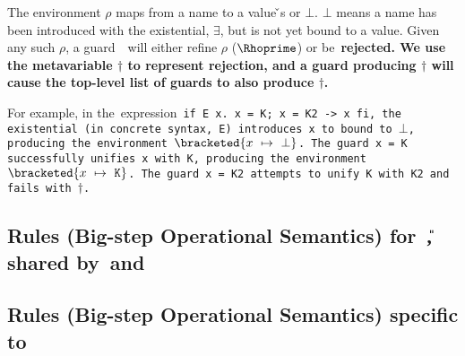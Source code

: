 \documentclass[manuscript,screen 12pt, nonacm]{acmart}
\begin{document}


The environment $\rho$ maps from a name to a value {\v}s or $\bot$. $\bot$ means
a name has been introduced with the existential, $\exists$, but is not yet bound
to a value. Given any such $\rho$, a guard~\g\ will either refine $\rho$
($\Rhoprime$) or be~\bf{rejected}. We use the metavariable $\dagger$ to
represent rejection, and a guard producing $\dagger$ will cause the top-level
list of guards to also produce $\dagger$. 

    \gfail

  For example, in the~\VMinus expression~\tt{if E x. x = K; x = K2 -> x fi}, the
  existential (in concrete syntax,~\tt{E}) introduces~\tt{x} to~\Rho bound to
  $\bot$, producing the environment $\bracketed{x~\mapsto~\bot}$. The guard
  \tt{x = K} successfully unifies~\tt{x} with~\tt{K}, producing the environment
  $\bracketed{x~\mapsto~\tt{K}}$. The guard~\tt{x = K2} attempts to unify~\tt{K}
  with~\tt{K2} and fails with $\dagger$. 

    
    \vfilbreak
    
    \subsection{Rules (Big-step Operational Semantics) for~\U, shared by~\VMinus and~\D}
    \label{usemantics1}
    \usemantics 
    \subsection{Rules (Big-step Operational Semantics) specific to~\VMinus}
    \label{vmsemantics}
    \vmsemantics
\end{document}
